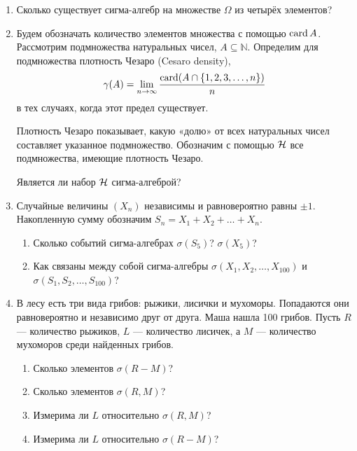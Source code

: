 \begin{enumerate}[resume]


\item Сколько существует сигма-алгебр на множестве $\Omega$ из четырёх элементов?

\item Будем обозначать количество элементов множества с помощью $\operatorname{card} A$.
Рассмотрим подмножества натуральных чисел, $A \subseteq \mathbb{N}$.
Определим для подмножества плотность Чезаро (Cesaro density),
\[
\gamma(A)=\lim_{n\to \infty}\frac{\operatorname{card} (A\cap \{1,2,3, \ldots,n\})}{n}
\]
в тех случаях, когда этот предел существует.

Плотность Чезаро показывает, какую «долю» от всех натуральных чисел составляет указанное подмножество.
Обозначим с помощью $\mathcal{H}$ все подмножества, имеющие плотность Чезаро.

Является ли набор $\mathcal{H}$ сигма-алгеброй?

\item Случайные величины $(X_n)$ независимы и равновероятно равны $\pm 1$.
Накопленную сумму обозначим $S_n = X_1 + X_2 + \dots + X_n$.

\begin{enumerate}
    \item Сколько событий сигма-алгебрах $\sigma(S_5)$? $\sigma(X_5)$?
    \item Как связаны между собой сигма-алгебры $\sigma(X_1, X_2, \dots, X_{100})$ и $\sigma(S_1, S_2, \dots, S_{100})$?
\end{enumerate}

\item В лесу есть три вида грибов: рыжики, лисички и мухоморы. 
Попадаются они равновероятно и независимо друг от друга. 
Маша нашла 100 грибов. 
Пусть $R$ — количество рыжиков, $L$ — количество лисичек, а $M$ — количество мухоморов среди найденных грибов.
\begin{enumerate}
\item Сколько элементов $\sigma(R - M)$?
\item Сколько элементов $\sigma(R, M)$?
\item Измерима ли $L$ относительно $\sigma(R, M)$?
\item Измерима ли $L$ относительно $\sigma(R - M)$?
\end{enumerate}


\end{enumerate}
